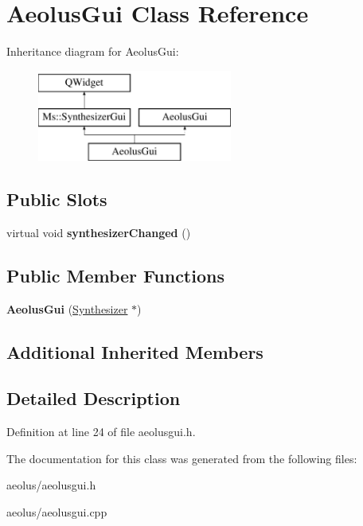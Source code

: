 \hypertarget{class_aeolus_gui}{}\section{Aeolus\+Gui Class Reference}
\label{class_aeolus_gui}
Inheritance diagram for Aeolus\+Gui\+:\begin{figure}[H]
\begin{center}
\leavevmode
\includegraphics[height=3.000000cm]{class_aeolus_gui}
\end{center}
\end{figure}
\subsection*{Public Slots}
\begin{DoxyCompactItemize}
\item 
\mbox{\label{class_aeolus_gui_a981e45100a5370d3f90e5e6b4acfa463}} 
virtual void {\bfseries synthesizer\+Changed} ()
\end{DoxyCompactItemize}
\subsection*{Public Member Functions}
\begin{DoxyCompactItemize}
\item 
\mbox{\label{class_aeolus_gui_af01bb545b1eea2dc6eea02da1a049fd2}} 
{\bfseries Aeolus\+Gui} (\hyperlink{class_ms_1_1_synthesizer}{Synthesizer} $\ast$)
\end{DoxyCompactItemize}
\subsection*{Additional Inherited Members}


\subsection{Detailed Description}


Definition at line 24 of file aeolusgui.\+h.



The documentation for this class was generated from the following files\+:\begin{DoxyCompactItemize}
\item 
aeolus/aeolusgui.\+h\item 
aeolus/aeolusgui.\+cpp\end{DoxyCompactItemize}
